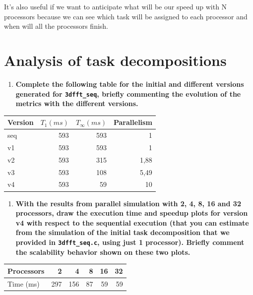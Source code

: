\documentclass[a4paper]{article}
\begin{document}
It’s also useful if we want to anticipate what will be our speed up with N processors because we can see which task will be assigned to each processor and when will all the processors finish.

\section*{Analysis of task decompositions}

\begin{enumerate}[resume]
	\item \textbf{Complete the following table for the initial and different versions generated for \texttt{3dfft\_seq}, briefly commenting the evolution of the metrics with the different versions.}
\end{enumerate}

\begin{center}
	\begin{tabular}{l|rrr}
		Version & $T_1(ms)$ & $T_{\infty}(ms)$ & Parallelism \\
		\hline
		seq & 593 & 593 & 1 \\
		v1 & 593 & 593 & 1 \\
		v2 & 593 & 315 & 1,88 \\
		v3 & 593 & 108 & 5,49 \\
		v4 & 593 & 59 & 10
	\end{tabular}
\end{center}

\begin{enumerate}[resume]
	\item \textbf{With the results from parallel simulation with 2, 4, 8, 16 and 32 processors, draw the execution time and speedup plots for version v4 with respect to the sequential execution (that you can estimate from the simulation of the initial task decomposition that we provided in \texttt{3dfft\_seq.c}, using just 1 processor). Briefly comment the scalability behavior shown on these two plots.}
\end{enumerate}

\begin{center}
    \begin{tabular}{l|rrrrr}
        Processors & 2 & 4 & 8 & 16 & 32 \\
        \hline
        Time (ms) & 297 & 156 & 87 & 59 & 59
    \end{tabular}
\end{center}

\begin{figure}[H]
    \centering
\end{figure}
\end{document}
